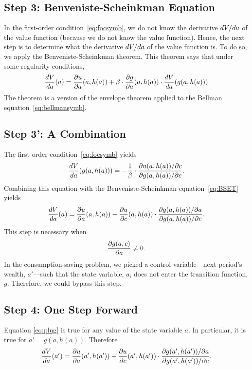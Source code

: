 \documentclass[letterpaper,12pt,leqno]{article}
\begin{document}
\subsection{Step 3: Benveniste-Scheinkman Equation}

In the first-order condition~\eqref{eq:focsymb}, we do not know  the derivative $d V/d a$ of the value function (because we do not know the value function). Hence, the next step is to determine what the derivative $d V/d a$ of the value function is. To do so, we apply the Benveniste-Scheinkman theorem. This theorem says that under some regularity conditions,
\begin{align}
\frac{d V}{d a}(a)=\frac{\partial  u}{\partial a}(a,h(a))+\beta\cdot \frac{\partial  g}{\partial a}(a,h(a))\cdot \frac{d V}{d a}(g(a,h(a)))\label{eq:BSET}
\end{align}
The theorem is a version of the envelope theorem applied to the Bellman equation~\eqref{eq:bellmansymb}.

\subsection{Step 3': A Combination}

The first-order condition~\eqref{eq:focsymb} yields
\begin{align}
\frac{d V}{d a}(g(a,h(a)))=-\frac{1}{\beta}\cdot \frac{\partial u(a,h(a))/\partial c}{\partial g(a,h(a))/\partial c}.
\end{align}
Combining this equation with the Benveniste-Scheinkman equation~\eqref{eq:BSET} yields
\begin{align}
\frac{d V}{d a}(a)=\frac{\partial u}{\partial a}(a,h(a))-\frac{\partial u}{\partial c}(a,h(a))\cdot \frac{\partial g(a,h(a))/\partial a}{\partial g(a,h(a))/\partial c}.\label{eq:plug}
\end{align}
This step is necessary when \[\frac{\partial g(a,c)}{\partial a}\neq 0.\] In the consumption-saving problem, we picked a
control variable---next period's wealth, $a'$---such that the state variable, $a$, does not enter the transition
function, $g$. Therefore, we could bypass this step.

\subsection{Step 4: One Step Forward}

Equation \eqref{eq:plug} is true for any value of the state variable $a$. In particular, it is true for $a'=g(a,h(a))$.
Therefore
\begin{align}
\frac{d V}{d a}(a')=\frac{\partial u}{\partial a}(a',h(a'))-\frac{\partial u}{\partial c}(a',h(a'))\cdot \frac{\partial g(a',h(a'))/\partial a}{\partial g(a',h(a'))/\partial c}.\label{eq:onestep}
\end{align}
\end{document}
